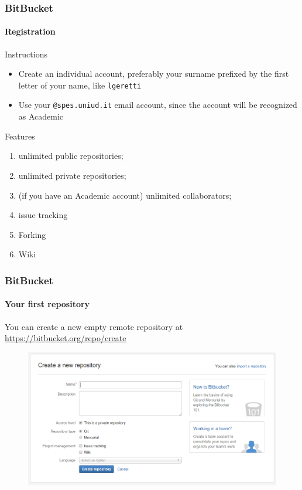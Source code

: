 \begin{frame}
\frametitle{BitBucket}
\framesubtitle{Registration}

\begin{block}{Instructions}
\begin{itemize}
\item Create an individual account, preferably your surname prefixed by the first letter of your name, like \texttt{lgeretti}
\item Use your \texttt{@spes.uniud.it} email account, since the account will be recognized as Academic
\end{itemize}
\end{block}
\begin{block}{Features}
\begin{enumerate}
\item unlimited public repositories;
\item unlimited private repositories;
\item (if you have an Academic account) unlimited collaborators;
\item issue tracking
\item Forking
\item Wiki
\end{enumerate}
\end{block}

\end{frame}

\begin{frame}
\frametitle{BitBucket}
\framesubtitle{Your first repository}

\medskip 

You can create a new empty remote repository at \url{https://bitbucket.org/repo/create}

\begin{figure}
\includegraphics[width=1.0\textwidth]{lecture04/img/createnewrepo.png}
\end{figure}

\end{frame}

